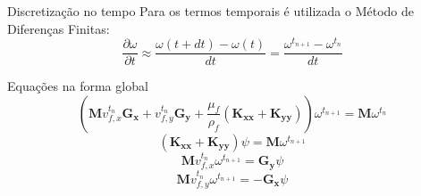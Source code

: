 \documentclass{beamer}
\begin{document}
\begin{frame}
  \frametitle{\subsecname}
  
  \begin{block}{Discretização no tempo}
    Para os termos temporais é utilizada o Método de Diferenças Finitas:
    \begin{equation*}
      \dfrac{\partial \omega}{\partial t} \approx
      \frac{
	  \omega(t + dt) -
	  \omega(t)
      }{dt}
      =
      \frac{
	  \omega^{t_{n+1}} -
	  \omega^{t_{n}}
      }{dt}
    \end{equation*}
  \end{block}
  
  \begin{block}{Equações na forma global}
    \begin{equation*}
      \left(
	  \mathbf{M} v_{f,x}^{t_{n}} \mathbf{G_x} + v_{f,y}^{t_{n}} \mathbf{G_y} + \dfrac{\mu_f}{\rho_f}
	  \left( \mathbf{K_{xx}} + \mathbf{K_{yy}} \right)
      \right)
      \omega^{t_{n+1}} = \mathbf{M} \omega^{t_{n}}
      \label{last_w}
    \end{equation*}
    \begin{equation*}
      \left( \mathbf{K_{xx}} + \mathbf{K_{yy}} \right)
      \psi = \mathbf{M} \omega^{t_{n+1}}
      \label{last_psi}
    \end{equation*}
    \begin{equation*}
      \mathbf{M} v_{f,x}^{t_{n}} \omega^{t_{n+1}} =
      \mathbf{G_y} \psi
      \label{last_vx}
    \end{equation*}
    \begin{equation*}
      \mathbf{M} v_{f,y}^{t_{n}} \omega^{t_{n+1}} = 
      -\mathbf{G_x} \psi
      \label{last_vy}
    \end{equation*}
  \end{block}
\end{frame}

\end{document}
